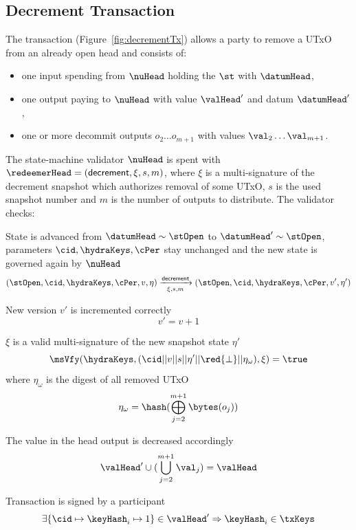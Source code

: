 \subsection{Decrement Transaction}\label{sec:decrement-tx}

\noindent The \mtxDecrement{} transaction (Figure~\ref{fig:decrementTx}) allows
a party to remove a UTxO from an already open head and consists of:

\begin{itemize}
  \item one input spending from $\nuHead$ holding the $\st$ with $\datumHead$,
  \item one output paying to $\nuHead$ with value $\valHead'$ and
  datum $\datumHead'$,
  \item one or more decommit outputs $o_{2} \dots o_{m+1}$ with values $\val_{2} \dots \val_{m+1} $.
\end{itemize}

\noindent The state-machine validator $\nuHead$ is spent with
$\redeemerHead = (\mathsf{decrement}, \xi, s, m)$, where $\xi$ is a multi-signature of
the decrement snapshot which authorizes removal of some UTxO, $s$ is the
used snapshot number and $m$ is the number of outputs to distribute. The
validator checks:
\begin{menumerate}
  \item State is advanced from $\datumHead \sim \stOpen$ to
  $\datumHead' \sim \stOpen$, parameters $\cid,\hydraKeys,\cPer$ stay
  unchanged and the new state is governed again by $\nuHead$
  \[
	(\stOpen,\cid,\hydraKeys,\cPer,v,\eta) \xrightarrow[\xi, s, m]{\mathsf{decrement}} (\stOpen,\cid,\hydraKeys,\cPer,v',\eta')
  \]
  \item New version $v'$ is incremented correctly
  \[
	v' = v + 1
  \]
  \item $\xi$ is a valid multi-signature of the new snapshot state $\eta'$
  \[
	\msVfy(\hydraKeys,(\cid || v || s || \eta' || \red{\bot} || \eta_\omega),\xi) = \true
  \]
  where $\eta_\omega$ is the digest of all removed UTxO
  \[
	\eta_\omega = \hash(\bigoplus_{j=2}^{m+1} \bytes(o_{j}))
  \]
  \item The value in the head output is decreased accordingly
  \[
	\valHead' \cup (\bigcup_{j=2}^{m+1} \val_{j}) = \valHead
  \]
  \item Transaction is signed by a participant
  \[
	\exists \{\cid \mapsto \keyHash_{i} \mapsto 1\} \in \valHead' \Rightarrow \keyHash_{i} \in \txKeys
  \]
\end{menumerate}

